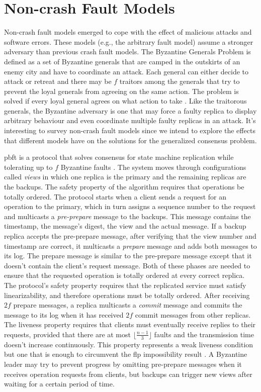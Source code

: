 \section{Non-crash Fault Models} \label{Non-Crash}
Non-crash fault models emerged to cope with the effect of malicious attacks and software errors. These models (e.g., the arbitrary fault model) assume a stronger adversary than previous crash fault models. The Byzantine Generals Problem is defined as a set of Byzantine generals that are camped in the outskirts of an enemy city and have to coordinate an attack. Each general can either decide to attack or retreat and there may be $f$ traitors among the generals that try to prevent the loyal generals from agreeing on the same action. The problem is solved if every loyal general agrees on what action to take \cite{Lamport1982}. Like the traitorous generals, the Byzantine adversary is one that may force a faulty replica to display arbitrary behaviour and even coordinate multiple faulty replicas in an attack. It's interesting to survey non-crash fault models since we intend to explore the effects that different models have on the solutions for the generalized consensus problem. \par
\acrfull{pbft} is a protocol that solves consensus for state machine replication while tolerating up to $f$ Byzantine faults \cite{Castro1999}. The system moves through configurations called \textit{views} in which one replica is the primary and the remaining replicas are the backups. The safety property of the algorithm requires that operations be totally ordered. The protocol starts when a client sends a request for an operation to the primary, which in turn assigns a sequence number to the request and multicasts a \textit{pre-prepare} message to the backups. This message contains the timestamp, the message's digest, the view and the actual message. If a backup replica accepts the pre-prepare message, after verifying that the view number and timestamp are correct, it multicasts a \textit{prepare} message and adds both messages to its log. The prepare message is similar to the pre-prepare message except that it doesn't contain the client's request message. Both of these phases are needed to ensure that the requested operation is totally ordered at every correct replica. The protocol's safety property requires that the replicated service must satisfy linearizability, and therefore operations must be totally ordered. After receiving $2f$ prepare messages, a replica multicasts a \textit{commit} message and commits the message to its log when it has received $2f$ commit messages from other replicas. The liveness property requires that clients must eventually receive replies to their requests, provided that there are at most $\lfloor\frac{n-1}{3}\rfloor$ faults and the transmission time doesn't increase continuously. This property represents a weak liveness condition but one that is enough to circumvent the \acrshort{flp} impossibility result \cite{Fischer1985}. A Byzantine leader may try to prevent progress by omitting pre-prepare messages when it receives operation requests from clients, but backups can trigger new views after waiting for a certain period of time. \par

